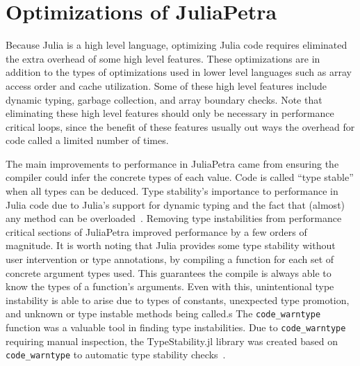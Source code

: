 \documentclass[acmsmall]{acmart}
\newcommand{\snippet}[1]{\lstinline{#1}}
\begin{document}
	\section{Optimizations of JuliaPetra}
	
	Because Julia is a high level language, optimizing Julia code requires eliminated the extra overhead of some high level features.
	These optimizations are in addition to the types of optimizations used in lower level languages such as array access order and cache utilization.
	Some of these high level features include dynamic typing, garbage collection, and array boundary checks.
	Note that eliminating these high level features should only be necessary in performance critical loops, since the benefit of these features usually out ways the overhead for code called a limited number of times.
	
	The main improvements to performance in JuliaPetra came from ensuring the compiler could infer the concrete types of each value.
	Code is called ``type stable'' when all types can be deduced.
	Type stability's importance to performance in Julia code due to Julia's support for dynamic typing and the fact that (almost) any method can be overloaded~\cite{Bezanson:2017:FreshApproach}.
	Removing type instabilities from performance critical sections of JuliaPetra improved performance by a few orders of magnitude.
	It is worth noting that Julia provides some type stability without user intervention or type annotations, by compiling a function for each set of concrete argument types used.
	This guarantees the compile is always able to know the types of a function's arguments.
	Even with this, unintentional type instability is able to arise due to types of constants, unexpected type promotion, and unknown or type instable methods being called.s
	The \snippet{code_warntype} function was a valuable tool in finding type instabilities.
	Due to \snippet{code_warntype} requiring manual inspection, the TypeStability.jl library was created
	based on \snippet{code_warntype} to automatic type stability checks~\cite{Github:TypeStability.jl}.
	
\end{document}
